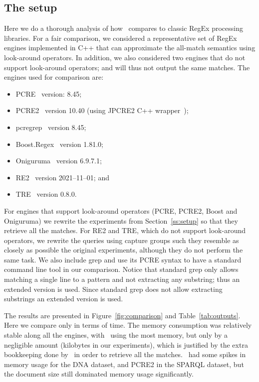 \subsection{The setup}
Here we do a thorough analysis of how \rematch\ compares to classic RegEx
processing libraries. For a fair comparison, we considered a representative set
of RegEx engines implemented in C++ that can approximate the all-match semantics
using look-around operators. In addition, we also considered two engines that do
not support look-around operators; and will thus not output the same matches.
The engines used for comparison are:
\begin{itemize}
	\item \textsf{PCRE}~\citep{pcre} version: 8.45;
	\item \textsf{PCRE2}~\citep{pcre2} version 10.40 (using JPCRE2 C++
	wrapper~\citep{wrapper});
	\item \textsf{pcregrep}~\citep{grep} version 8.45;
	\item \textsf{Boost.Regex}~\citep{boost} version 1.81.0;
	\item \textsf{Oniguruma}~\citep{oniguruma} version 6.9.7.1;
	\item \textsf{RE2}~\citep{re2} version 2021--11--01; and
	\item \textsf{TRE}~\citep{tre} version 0.8.0.
\end{itemize}
For engines that support look-around operators (\textsf{PCRE}, \textsf{PCRE2},
\textsf{Boost} and \textsf{Oniguruma}) we rewrite the experiments from
Section~\ref{ss:setup} so that they retrieve all the matches. For \textsf{RE2}
and \textsf{TRE}, which do not support look-around operators, we rewrite the
queries using capture groups such they resemble as closely as possible the
original experiments, although they do not perform the same task. We also
include \textsf{grep} and use its PCRE syntax to have a standard command line
tool in our comparison. Notice that standard \textsf{grep} only allows matching
a single line to a pattern and not extracting any substring; thus an extended
version is used. Since standard \textsf{grep} does not allow extracting
substrings an extended version is used.


The results are presented in Figure~\ref{fig:comparison} and
Table~\ref{tab:outputs}. Here we compare only in terms of time. The memory
consumption was relatively stable along all the engines, with \rematch\ using
the most memory, but only by a negligible amount (kilobytes in our experiments),
which is justified by the extra bookkeeping done by \rematch\ in order to
retrieve all the matches.  \rematch\ had some spikes in memory usage for the
\textsf{DNA} dataset, and \textsf{PCRE2} in the \textsf{SPARQL} dataset, but the
document size still dominated memory usage significantly.

